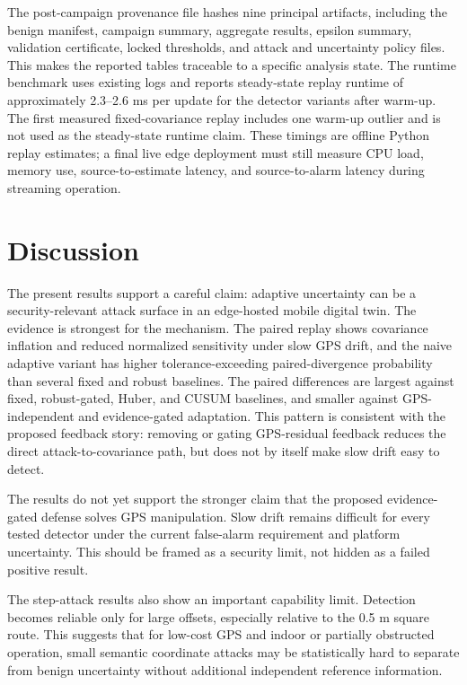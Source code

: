 \documentclass[conference]{IEEEtran}
\begin{document}
The post-campaign provenance file hashes nine principal artifacts, including
the benign manifest, campaign summary, aggregate results, epsilon summary,
validation certificate, locked thresholds, and attack and uncertainty policy
files. This makes the reported tables traceable to a specific analysis state.
The runtime benchmark uses existing logs and reports steady-state replay
runtime of approximately 2.3--2.6 ms per update for the detector variants after
warm-up. The first measured fixed-covariance replay includes one warm-up
outlier and is not used as the steady-state runtime claim. These timings are
offline Python replay estimates; a final live edge deployment must still
measure CPU load, memory use, source-to-estimate latency, and source-to-alarm
latency during streaming operation.

\section{Discussion}
\label{sec:discussion}

The present results support a careful claim: adaptive uncertainty can be a
security-relevant attack surface in an edge-hosted mobile digital twin. The
evidence is strongest for the mechanism. The paired replay shows covariance
inflation and reduced normalized sensitivity under slow GPS drift, and the
naive adaptive variant has higher tolerance-exceeding paired-divergence probability than
several fixed and robust baselines. The paired differences are largest against
fixed, robust-gated, Huber, and CUSUM baselines, and smaller against
GPS-independent and evidence-gated adaptation. This pattern is consistent with
the proposed feedback story: removing or gating GPS-residual feedback reduces
the direct attack-to-covariance path, but does not by itself make slow drift
easy to detect.

The results do not yet support the stronger claim that the proposed
evidence-gated defense solves GPS manipulation. Slow drift remains difficult
for every tested detector under the current false-alarm requirement and
platform uncertainty. This should be framed as a security limit, not hidden as
a failed positive result.

The step-attack results also show an important capability limit. Detection
becomes reliable only for large offsets, especially relative to the 0.5 m
square route. This suggests that for low-cost GPS and indoor or partially
obstructed operation, small semantic coordinate attacks may be statistically
hard to separate from benign uncertainty without additional independent
reference information.
\end{document}

